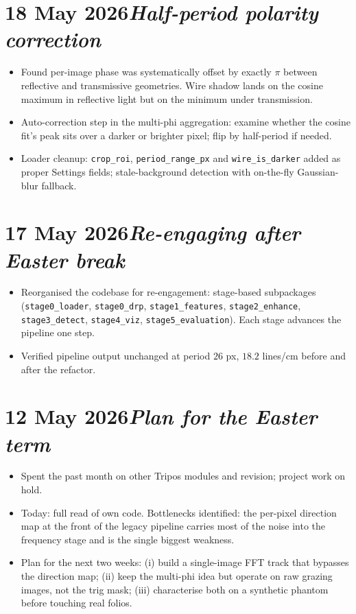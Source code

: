 \documentclass[11pt,a4paper]{article}
\newcommand{\logentry}[2]{\section*{#1\hfill\normalfont\normalsize\textit{#2}}}
\begin{document}
\logentry{18 May 2026}{Half-period polarity correction}
\begin{itemize}
  \item Found per-image phase was systematically offset by exactly $\pi$ between reflective and transmissive geometries. Wire shadow lands on the cosine maximum in reflective light but on the minimum under transmission.
  \item Auto-correction step in the multi-phi aggregation: examine whether the cosine fit's peak sits over a darker or brighter pixel; flip by half-period if needed.
  \item Loader cleanup: \texttt{crop\_roi}, \texttt{period\_range\_px} and \texttt{wire\_is\_darker} added as proper Settings fields; stale-background detection with on-the-fly Gaussian-blur fallback.
\end{itemize}

\logentry{17 May 2026}{Re-engaging after Easter break}
\begin{itemize}
  \item Reorganised the codebase for re-engagement: stage-based subpackages (\texttt{stage0\_loader}, \texttt{stage0\_drp}, \texttt{stage1\_features}, \texttt{stage2\_enhance}, \texttt{stage3\_detect}, \texttt{stage4\_viz}, \texttt{stage5\_evaluation}). Each stage advances the pipeline one step.
  \item Verified pipeline output unchanged at period $26$ px, $18.2$ lines/cm before and after the refactor.
\end{itemize}

\logentry{12 May 2026}{Plan for the Easter term}
\begin{itemize}
  \item Spent the past month on other Tripos modules and revision; project work on hold.
  \item Today: full read of own code. Bottlenecks identified: the per-pixel direction map at the front of the legacy pipeline carries most of the noise into the frequency stage and is the single biggest weakness.
  \item Plan for the next two weeks: (i) build a single-image FFT track that bypasses the direction map; (ii) keep the multi-phi idea but operate on raw grazing images, not the trig mask; (iii) characterise both on a synthetic phantom before touching real folios.
\end{itemize}

\end{document}
